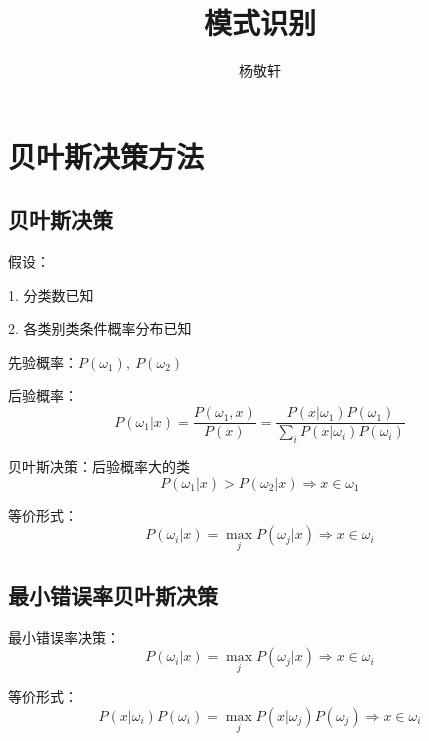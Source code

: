 \documentclass[openany]{ctexbook}
\theoremstyle{kaiti}
\theoremstyle{normal}
\begin{document}
\title{\heiti \Huge 模式识别 \vspace{0.5cm}}
\author{\LARGE\kaishu 杨敬轩 \vspace{1cm}}

\maketitle
\thispagestyle{empty}

\frontmatter
\tableofcontents

\mainmatter
\chapter{贝叶斯决策方法}

\section{贝叶斯决策}

假设：

1. 分类数已知

2. 各类别类条件概率分布已知

先验概率：$P\left(\omega_1 \right),~P\left(\omega_2 \right)$

后验概率：
\begin{equation}
P\left(\omega_1|x \right)=\frac{P\left(\omega_1,x \right)}{P(x)}=\frac{P\left(x|\omega_1 \right)P\left(\omega_1 \right)}{\sum_iP\left(x|\omega_i \right)P\left(\omega_i \right)}
\end{equation}

贝叶斯决策：后验概率大的类
\begin{equation}
P\left(\omega_1|x \right)>P\left(\omega_2|x \right)\Rightarrow x\in \omega_1
\end{equation}

等价形式：
\begin{equation}
P\left(\omega_i|x \right)=\max_jP\left(\omega_j|x \right)\Rightarrow x\in \omega_i
\end{equation}

\section{最小错误率贝叶斯决策}

最小错误率决策：
\begin{equation}
P\left(\omega_i|x \right)=\max_jP\left(\omega_j|x \right)\Rightarrow x\in \omega_i
\end{equation}

等价形式：
\begin{equation}
P\left(x|\omega_i \right)P\left(\omega_i \right)=\max_jP\left(x|\omega_j \right)P\left(\omega_j \right)\Rightarrow x\in \omega_i
\end{equation}
\end{document}
